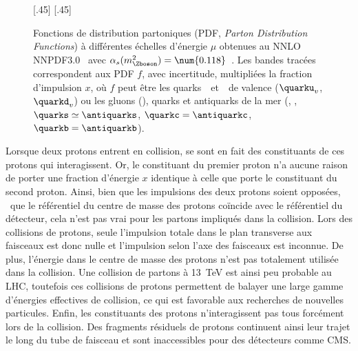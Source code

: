\begin{figure}[t]
\centering
{}[.45\textwidth]
{}
\hfill
{}[.45\textwidth]
{}
\caption[Fonctions de distribution partoniques.]{Fonctions de distribution partoniques (PDF, \emph{Parton Distribution Functions}) à différentes échelles d'énergie $\mu$ obtenues au NNLO NNPDF3.0~\cite{NNPDF30} avec $\alpha_s(m_{\Zboson}^2)=\num{0.118}$~\cite{PDG_booklet_2020}. Les bandes tracées correspondent aux PDF $f$, avec incertitude, multipliées la fraction d'impulsion $x$, où $f$ peut être les quarks~\quarku\ et~\quarkd\ de valence ($\quarku_v$, $\quarkd_v$) ou les gluons (\gluon), quarks et antiquarks de la mer (\antiquarku, \antiquarkd, $\quarks\simeq\antiquarks$, $\quarkc=\antiquarkc$, $\quarkb=\antiquarkb$).}
\label{fig-proton_PDFs}
\end{figure}
\par Lorsque deux protons entrent en collision, se sont en fait des constituants de ces protons qui interagissent.
Or, le constituant du premier proton n'a aucune raison de porter une fraction d'énergie $x$ identique à celle que porte le constituant du second proton.
Ainsi, bien que les impulsions des deux protons soient opposées, \ie\ que le référentiel du centre de masse des protons coïncide avec le référentiel du détecteur, cela n'est pas vrai pour les partons impliqués dans la collision.
Lors des collisions de protons, seule l'impulsion totale dans le plan transverse aux faisceaux est donc nulle et l'impulsion selon l'axe des faisceaux est inconnue.
De plus, l'énergie dans le centre de masse des protons n'est pas totalement utilisée dans la collision.
Une collision de partons à \SI{13}{\TeV} est ainsi peu probable au LHC, toutefois ces collisions de protons permettent de balayer une large gamme d'énergies effectives de collision, ce qui est favorable aux recherches de nouvelles particules.
Enfin, les constituants des protons n'interagissent pas tous forcément lors de la collision.
Des fragments résiduels de protons continuent ainsi leur trajet le long du tube de faisceau et sont inaccessibles pour des détecteurs comme CMS.

